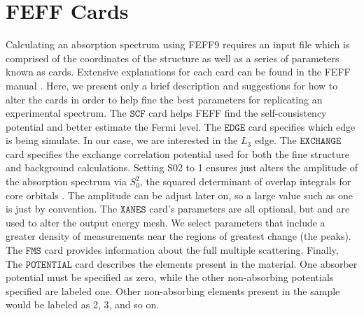 \section{FEFF Cards} \label{app:feff-cards}
Calculating an absorption spectrum using FEFF9 requires an input file which is comprised of the coordinates of the structure as well as a series of parameters known as cards. Extensive explanations for each card can be found in the FEFF manual \cite{rehr2010parameter}. Here, we present only a brief description and suggestions for how to alter the cards in order to help fine the best parameters for replicating an experimental spectrum.  The $ \texttt{SCF} $  card helps FEFF find the self-consistency potential and better estimate the Fermi level. The $ \texttt{EDGE} $ card specifies which edge is being simulate. In our case, we are interested in the $L_3$ edge. The $ \texttt{EXCHANGE} $ card specifies the exchange correlation potential used for both the fine structure and background calculations. Setting S02 to 1 ensures just alters the amplitude of the absorption spectrum via $ S_0^2 $, the squared determinant of overlap integrals for core orbitals \cite{rehr2010parameter}. The amplitude can be adjust later on, so a large value such as one is just by convention. The $ \texttt{XANES} $ card's parameters are all optional, but and are used to alter the output energy mesh. We select parameters that include a greater density of measurements near the regions of greatest change (the peaks). The $ \texttt{FMS} $ card provides information about the full multiple scattering. Finally, The $ \texttt{POTENTIAL} $ card describes the elements present in the material. One absorber potential must be specified as zero, while the other non-absorbing potentials specified are labeled one. Other non-absorbing elements present in the sample would be labeled as 2, 3, and so on.


	


